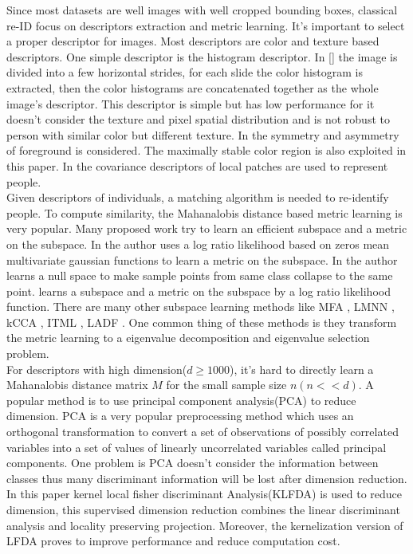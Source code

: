 \documentclass[conference,compsoc]{IEEEtran}
\begin{document}
Since most datasets are well images with well cropped bounding boxes, classical re-ID focus on descriptors extraction and metric learning. It's important to select a proper descriptor for images. Most descriptors are color and texture based descriptors. One simple descriptor is the histogram descriptor. In [] the image is divided into a few horizontal strides, for each slide the color histogram is extracted, then the color histograms are concatenated together as the whole image's descriptor. This descriptor is simple but has low performance for it doesn't consider the texture and pixel spatial distribution and is not robust to person with similar color but different texture.  In \cite{SDALF,LOMO} the symmetry and asymmetry of foreground is considered. The maximally stable color region is also exploited in this paper. In \cite{RegionCovariance} the covariance descriptors of local patches are used to represent people. \\
\indent Given descriptors of individuals, a matching algorithm is needed to re-identify people. To compute similarity, the Mahanalobis distance based metric learning is very popular. Many proposed work \cite{LADF,LOMO,KISSME} try to learn an efficient subspace and a metric on the subspace. In \cite{KISSME} the author uses a log ratio likelihood based on zeros mean multivariate gaussian functions to learn a metric on the subspace. In \cite{NFST} the author learns a null space to make sample points from same class collapse to the same point. \cite{LOMO} learns a subspace and a metric on the subspace by a log ratio likelihood function.  There are many other subspace learning methods like MFA \cite{KernelVersionMetrics}, LMNN \cite{LMNN}, kCCA \cite{KCCA}, ITML \cite{ITML}, LADF \cite{LADF}.  One common thing of these methods is they transform the metric learning to a eigenvalue decomposition and eigenvalue selection problem.\\
\indent For descriptors with high dimension($d\ge1000$), it's hard to directly learn a Mahanalobis distance matrix $M$ for the small sample size $n(n<<d)$. A popular method is to use principal component analysis(PCA) to reduce dimension. PCA is a very popular preprocessing method which uses an orthogonal transformation to convert a set of observations of possibly correlated variables into a set of values of linearly uncorrelated variables called principal components. One problem is  PCA doesn't consider the information between classes thus many discriminant information will be lost after dimension reduction. In this paper kernel local fisher discriminant Analysis(KLFDA) \cite{KLFDA} is used to reduce dimension, this supervised dimension reduction combines the linear discriminant analysis and locality preserving projection. Moreover, the kernelization version of LFDA proves to improve performance and reduce computation cost. \\
\end{document}
